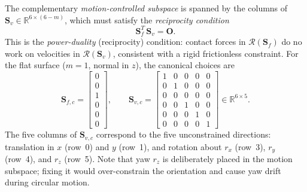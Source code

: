 \documentclass[
	german,%
	accentcolor=9c,%
	ruledheaders=section,%
	class=report,%
	thesis={type=bachelor},%
	fontsize=11pt,%
	parskip=half-,%
	custommargins=true,%
	marginpar=false,%
]{tudapub}
\begin{document}
The complementary \emph{motion-controlled subspace} is spanned by the columns
of $\mathbf{S}_{v} \in \mathbb{R}^{6\times(6-m)}$, which must satisfy the
\emph{reciprocity condition}
%
\begin{equation}
    \mathbf{S}_{f}^{T}\,\mathbf{S}_{v} = \mathbf{O}.
    \label{eq:reciprocity}
\end{equation}
%
This is the \emph{power-duality} (reciprocity) condition: contact forces in
$\mathcal{R}(\mathbf{S}_f)$ do no work on velocities in
$\mathcal{R}(\mathbf{S}_v)$, consistent with a rigid frictionless constraint.
For the flat surface ($m = 1$, normal in $z$), the canonical choices are
%
\begin{equation}
    \mathbf{S}_{f,c}
    = \begin{bmatrix}0\\0\\1\\0\\0\\0\end{bmatrix},
    \qquad
    \mathbf{S}_{v,c} =
    \begin{bmatrix}
        1 & 0 & 0 & 0 & 0 \\
        0 & 1 & 0 & 0 & 0 \\
        0 & 0 & 0 & 0 & 0 \\
        0 & 0 & 1 & 0 & 0 \\
        0 & 0 & 0 & 1 & 0 \\
        0 & 0 & 0 & 0 & 1
    \end{bmatrix}
    \in \mathbb{R}^{6 \times 5}.
    \label{eq:Sv_flat}
\end{equation}
%
The five columns of $\mathbf{S}_{v,c}$ correspond to the five unconstrained
directions: translation in $x$ (row~0) and $y$ (row~1), and rotation about
$r_x$ (row~3), $r_y$ (row~4), and $r_z$ (row~5).
Note that yaw $r_z$ is deliberately placed in the motion subspace; fixing it
would over-constrain the orientation and cause yaw drift during circular motion.
\end{document}
